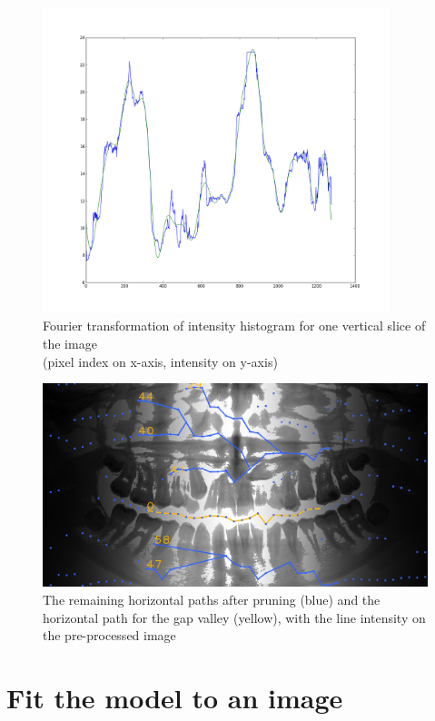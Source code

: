 \documentclass[a4paper,10pt]{article}
\begin{document}
\begin{figure}[htbp]
	\centering
	\includegraphics[width=0.9\textwidth, trim=0cm 2.5cm 0cm 3cm, clip]{fourier_intensity}
	\caption{Fourier transformation of intensity histogram for one vertical slice of the image \\(pixel index on x-axis, intensity on y-axis)}
	\label{fig:fourier}
\end{figure}

\begin{figure}[htbp]
	\centering
	\includegraphics[width=1\textwidth, trim=0cm 0cm 0cm 0cm, clip]{paths}
	\caption{The remaining horizontal paths after pruning (blue) and the horizontal path for the gap valley (yellow), with the line intensity on the pre-processed image}
	\label{fig:paths}
\end{figure}


\section{Fit the model to an image}
\end{document}

